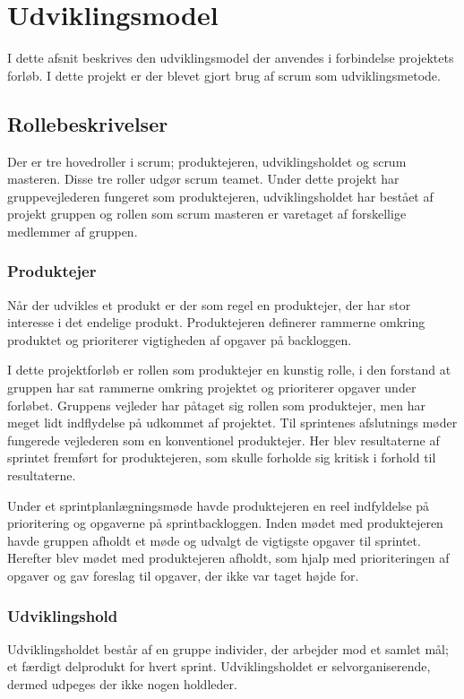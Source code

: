 \chapter{Udviklingsmodel}
I dette afsnit beskrives den udviklingsmodel der anvendes i forbindelse projektets forløb. I dette projekt er der blevet gjort brug af scrum som udviklingsmetode.

\section{Rollebeskrivelser}
Der er tre hovedroller i scrum; produktejeren, udviklingsholdet og scrum masteren. Disse tre roller udgør scrum teamet. Under dette projekt har gruppevejlederen fungeret som produktejeren, udviklingsholdet har bestået af projekt gruppen og rollen som scrum masteren er varetaget af forskellige medlemmer af gruppen.

\subsection{Produktejer}
Når der udvikles et produkt er der som regel en produktejer, der har stor interesse i det endelige produkt. Produktejeren definerer rammerne omkring produktet og prioriterer vigtigheden af opgaver på backloggen. \newline

I dette projektforløb er rollen som produktejer en kunstig rolle, i den forstand at gruppen har sat rammerne omkring projektet og prioriterer opgaver under forløbet. Gruppens vejleder har påtaget sig rollen som produktejer, men har meget lidt indflydelse på udkommet af projektet. Til sprintenes afslutnings møder fungerede vejlederen som en konventionel produktejer. Her blev resultaterne af sprintet fremført for produktejeren, som skulle forholde sig kritisk i forhold til resultaterne.

Under et sprintplanlægningsmøde havde produktejeren en reel indfyldelse på prioritering og opgaverne på sprintbackloggen. Inden mødet med produktejeren havde gruppen afholdt et møde og udvalgt de vigtigste opgaver til sprintet. Herefter blev mødet med produktejeren afholdt, som hjalp med prioriteringen af opgaver og gav foreslag til opgaver, der ikke var taget højde for.  

\subsection{Udviklingshold}
Udviklingsholdet består af en gruppe individer, der arbejder mod et samlet mål; et færdigt delprodukt for hvert sprint. Udviklingsholdet er selvorganiserende, dermed udpeges der ikke nogen holdleder. \newline

